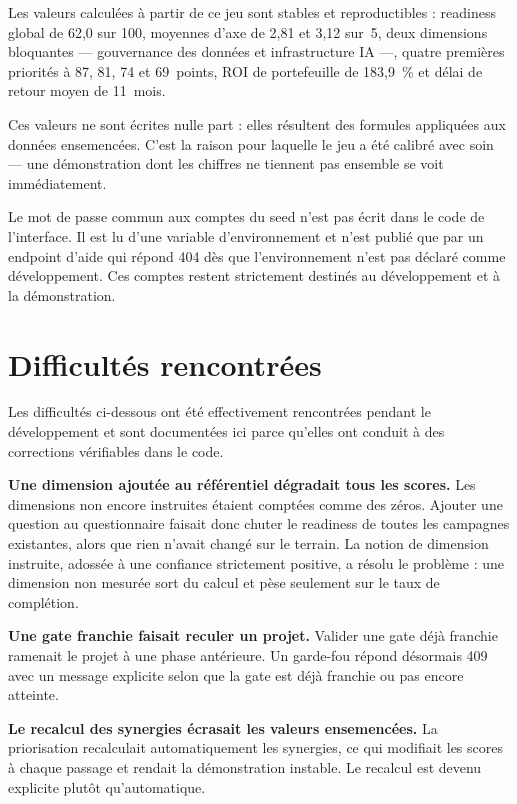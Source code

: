 Les valeurs calculées à partir de ce jeu sont stables et reproductibles : readiness
global de 62,0 sur 100, moyennes d'axe de 2,81 et 3,12 sur~5, deux dimensions bloquantes
— gouvernance des données et infrastructure IA —, quatre premières priorités à 87, 81,
74 et 69~points, ROI de portefeuille de 183,9~\% et délai de retour moyen de 11~mois.

Ces valeurs ne sont écrites nulle part : elles résultent des formules appliquées aux
données ensemencées. C'est la raison pour laquelle le jeu a été calibré avec soin — une
démonstration dont les chiffres ne tiennent pas ensemble se voit immédiatement.

\begin{remarque}
Le mot de passe commun aux comptes du seed n'est pas écrit dans le code de l'interface.
Il est lu d'une variable d'environnement et n'est publié que par un endpoint d'aide qui
répond 404 dès que l'environnement n'est pas déclaré comme développement. Ces comptes
restent strictement destinés au développement et à la démonstration.
\end{remarque}

\section{Difficultés rencontrées}

Les difficultés ci-dessous ont été effectivement rencontrées pendant le développement et
sont documentées ici parce qu'elles ont conduit à des corrections vérifiables dans le
code.

\textbf{Une dimension ajoutée au référentiel dégradait tous les scores.} Les dimensions
non encore instruites étaient comptées comme des zéros. Ajouter une question au
questionnaire faisait donc chuter le readiness de toutes les campagnes existantes,
alors que rien n'avait changé sur le terrain. La notion de dimension instruite, adossée
à une confiance strictement positive, a résolu le problème : une dimension non mesurée
sort du calcul et pèse seulement sur le taux de complétion.

\textbf{Une gate franchie faisait reculer un projet.} Valider une gate déjà franchie
ramenait le projet à une phase antérieure. Un garde-fou répond désormais 409 avec un
message explicite selon que la gate est déjà franchie ou pas encore atteinte.

\textbf{Le recalcul des synergies écrasait les valeurs ensemencées.} La priorisation
recalculait automatiquement les synergies, ce qui modifiait les scores à chaque passage
et rendait la démonstration instable. Le recalcul est devenu explicite plutôt
qu'automatique.

